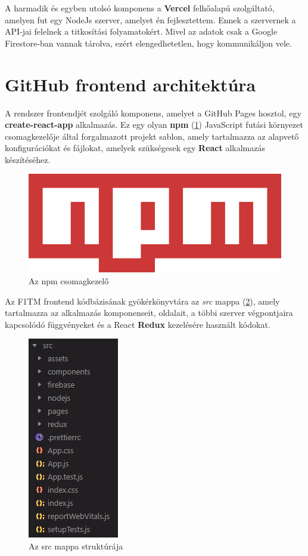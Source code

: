 A harmadik és egyben utolsó komponens a \textbf{Vercel} felhőalapú szolgáltató, amelyen fut egy NodeJs szerver, amelyet én fejlesztettem. Ennek a szervernek a API-jai felelnek a titkosítási folyamatokért. Mivel az adatok csak a {Google Firestore}-ban vannak tárolva, ezért elengedhetetlen, hogy kommunikáljon vele. 

\section {GitHub frontend architektúra} \label{frontend}

A rendszer frontendjét szolgáló komponens, amelyet a GitHub Pages hosztol, egy \textbf{create-react-app} alkalmazás. Ez egy olyan \textbf{npm} (\ref{abra:npmLogo}) JavaScript futási környezet csomagkezelője \cite{WikiNpm} által forgalmazott projekt sablon, amely tartalmazza az alapvető konfigurációkat és fájlokat, amelyek szükségesek egy \textbf{React} alkalmazás készítéséhez.

\begin{figure}[!h]
	\centering
	\includegraphics[scale=0.2]{images/npmLogo}
	\caption{Az npm csomagkezelő}
	\label{abra:npmLogo}
\end{figure}

Az F1TM frontend kódbázisának gyökérkönyvtára az \textit{src} mappa (\ref{abra:srcFolderStructure}), amely tartalmazza az alkalmazás komponenseit, oldalait, a többi szerver végpontjaira kapcsolódó függvényeket és a React \textbf{Redux} kezelésére használt kódokat.

\begin{figure}[!h]
	\centering
	\includegraphics[scale=0.6]{images/srcFolderStructure}
	\caption{Az src mappa struktúrája}
	\label{abra:srcFolderStructure}
\end{figure}

